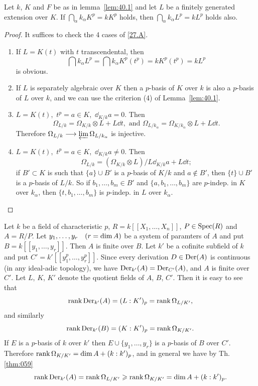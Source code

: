 \documentclass[../main]{subfiles}
\begin{document}
\begin{lemma}
\label{lem:40.2}
Let $k$, $K$ and $F$ be as in lemma~\ref{lem:40.1} and let $L$ be a finitely generated extension over $K$. If $\bigcap\limits_\alpha k_\alpha K^p = k K^p$ holds, then $\bigcap\limits_\alpha k_\alpha L^p = k L^p$ holds also. 
\end{lemma}

\begin{proof}
It suffices to check the 4 cases of \ref{27.A}. 
\begin{enumerate}[label = \roman*)]
    \item If $L = K(t)$ with $t$ transcendental, then \[\bigcap k_\alpha L^p = \bigcap k_\alpha K^p(t^p) = k K^p(t^p) = k L^p\] is obvious. 
    \item If $L$ is separately algebraic over $K$ then a $p$-basis of $K$ over $k$ is also a $p$-basis of $L$ over $k$, and we can use the criterion (4) of Lemma~\ref{lem:40.1}.
    \item $L = K(t)$, $\, t^p = a \in K$, $\, \dd_{K/k} a = 0$. Then \[\Omega_{L/k} = \Omega_{K/k} \otimes L + L \dd t,\text{ and }\Omega_{L/k_\alpha} = \Omega_{K/k_\alpha} \otimes L + L \dd t.\] Therefore $\Omega_{L/k} \longrightarrow \varprojlim \Omega_{L/k_\alpha}$ is injective. 
    \item $L = K(t)$, $\, t^p = a \in K$, $\,\dd_{K/k} a \ne 0$. Then \[\Omega_{L/k} = (\Omega_{K/k} \otimes L)/L \dd_{K/k} a + L \dd t;\] if $B' \subset K$ is such that $\{a\} \cup B'$ is a $p$-basis of $K/k$ and $a \not \in B'$, then $\{t\} \cup B'$ is a $p$-basis of $L/k$. So if $b_1, \ldots, b_m \in B'$ and $\{a, b_1, \ldots, b_m\}$ are $p$-indep. in $K$ over $k_\alpha$, then $\{t, b_1, \ldots, b_m\}$ is $p$-indep. in $L$ over $k_\alpha$. 
\end{enumerate}

\end{proof}

\newparagraph Let $k$ be a field of characteristic $p$, $R = k[[X_1, \ldots, X_n]]$, $P \in \operatorname{Spec}(R)$ and $A = R/P$. Let $y_1, \ldots, y_r\for{r = \dim A}$ be a system of paramters of $A$ and put $B = k[[y_1, \ldots, y_r]]$. Then $A$ is finite over $B$. Let $k'$ be a cofinite subfield of $k$ and put $C' = k'[[y_1^p, \ldots, y_r^p]]$. Since every derivation $D \in \operatorname{Der}(A)$ is continuous (in any ideal-adic topology), we have $\operatorname{Der}_{k'}(A) = \operatorname{Der}_{C'}(A)$, and $A$ is finite over $C'$. Let $L$, $K$, $K'$ denote the quotient fields of $A$, $B$, $C'$. Then it is easy to see that \[\operatorname{rank} \operatorname{Der}_{k'}(A) = (L:K')_p = \operatorname{rank} \Omega_{L/K'},\] and similarly \[\operatorname{rank} \operatorname{Der}_{k'}(B) = (K : K')_p = \operatorname{rank} \Omega_{K/K'}.\] If $E$ is a $p$-basis of $k$ over $k'$ then $E \cup \{y_1, \ldots, y_r\}$ is a $p$-basis of $B$ over $C'$. Therefore $\operatorname{rank} \Omega_{K/K'} = \operatorname{dim} A + (k : k')_p$, and in general we have by Th.\ref{thm:059}
\[
\operatorname{rank} \operatorname{Der}_{k'}(A) = \operatorname{rank} \Omega_{L/K'} \geqslant \operatorname{rank} \Omega_{K/K'} = \operatorname{dim} A + (k : k')_p.
\]
\end{document}
